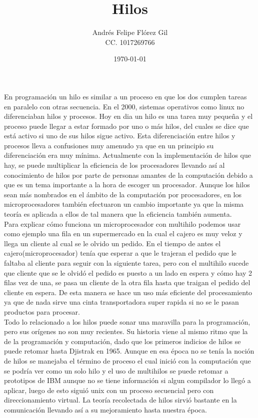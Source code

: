 \documentclass[a4paper]{article}
\title{Hilos}
\author{Andrés Felipe Flórez Gil \\ CC. 1017269766}
\date{\today}
\begin{document}
\maketitle
En programación un hilo es similar a un proceso en que los dos cumplen tareas  en paralelo con otras secuencia. En el 2000, sistemas operativos como linux no diferenciaban hilos y procesos. Hoy en dia un hilo es una tarea muy pequeña y el proceso puede llegar a estar formado por uno o más hilos, del cuales se dice que está activo si uno de sus hilos sigue activo. Esta diferenciación entre hilos y procesos lleva a confusiones muy amenudo ya que en un principio su diferenciación era muy mínima. Actualmente con la implementación de hilos que hay, se puede multiplicar la eficiencia de los procesadores llevando así al conocimiento de hilos por parte de personas amantes de la computación debido a que es un tema importante a la hora de escoger un procesador. Aunque los hilos sean más nombrados en el ámbito de la computación por procesadores, en los microprocesadores también efectuaron un cambio importante ya que la misma teoría es aplicada a ellos de tal manera que la eficiencia también aumenta.\\

Para explicar cómo funciona un microprocesador con multihilo podemos usar como ejemplo una fila en un supermercado en la cual el cajero es muy veloz y llega un cliente al cual se le olvido un pedido. En el tiempo de antes el cajero(microprocesador) tenía que esperar a que le trajeran el pedido que le faltaba al cliente para seguir con la siguiente tarea, pero con el multihilo sucede que cliente que se le olvidó el pedido es puesto a un lado en espera y cómo hay 2 filas vez de una, se pasa un cliente de la otra fila hasta que traigan el pedido del cliente en espera. De esta manera se hace un uso más eficiente del procesamiento ya que de nada sirve una cinta transportadora super rapida si no se le pasan productos para procesar.\\

Todo lo relacionado a los hilos puede sonar una maravilla para la programación,  pero sus orígenes no son  muy recientes. Su historia viene al mismo ritmo que la de la programación y computación, dado que los primeros indicios de hilos se puede retomar hasta Djistrak en 1965. Aunque en esa época no se tenía la noción de hilos se manejaba el término de proceso el cual inició con la computación que se podría ver como un solo hilo y el uso de multihilos se puede retomar a prototipos de IBM aunque no se tiene información si algun compilador lo llegó a aplicar, luego de esto siguió unix con un proceso secuencial pero con direccionamiento virtual. La teoría recolectada de hilos sirvió bastante en la comunicación llevando así a su mejoramiento hasta nuestra época.\\
\\\\
\end{document}
